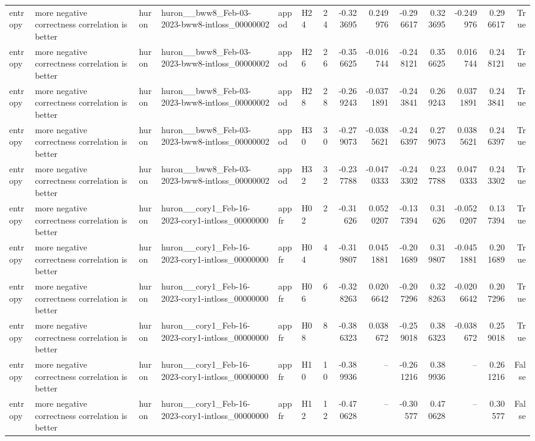 \begin{longtable}{llllllrrrrrrrr}
entropy & more negative correctness correlation is better & huron & huron\_\_bww8\_Feb-03-2023-bww8-intloss\_00000002 & appod & H24 & 24 & -0.323695 & 0.249976 & -0.296617 & 0.323695 & -0.249976 & 0.296617 & True \\
entropy & more negative correctness correlation is better & huron & huron\_\_bww8\_Feb-03-2023-bww8-intloss\_00000002 & appod & H26 & 26 & -0.356625 & -0.016744 & -0.248121 & 0.356625 & 0.016744 & 0.248121 & True \\
entropy & more negative correctness correlation is better & huron & huron\_\_bww8\_Feb-03-2023-bww8-intloss\_00000002 & appod & H28 & 28 & -0.269243 & -0.0371891 & -0.243841 & 0.269243 & 0.0371891 & 0.243841 & True \\
entropy & more negative correctness correlation is better & huron & huron\_\_bww8\_Feb-03-2023-bww8-intloss\_00000002 & appod & H30 & 30 & -0.279073 & -0.0385621 & -0.246397 & 0.279073 & 0.0385621 & 0.246397 & True \\
entropy & more negative correctness correlation is better & huron & huron\_\_bww8\_Feb-03-2023-bww8-intloss\_00000002 & appod & H32 & 32 & -0.237788 & -0.0470333 & -0.243302 & 0.237788 & 0.0470333 & 0.243302 & True \\
entropy & more negative correctness correlation is better & huron & huron\_\_cory1\_Feb-16-2023-cory1-intloss\_00000000 & appfr & H02 & 2 & -0.31626 & 0.0520207 & -0.137394 & 0.31626 & -0.0520207 & 0.137394 & True \\
entropy & more negative correctness correlation is better & huron & huron\_\_cory1\_Feb-16-2023-cory1-intloss\_00000000 & appfr & H04 & 4 & -0.319807 & 0.0451881 & -0.201689 & 0.319807 & -0.0451881 & 0.201689 & True \\
entropy & more negative correctness correlation is better & huron & huron\_\_cory1\_Feb-16-2023-cory1-intloss\_00000000 & appfr & H06 & 6 & -0.328263 & 0.0206642 & -0.207296 & 0.328263 & -0.0206642 & 0.207296 & True \\
entropy & more negative correctness correlation is better & huron & huron\_\_cory1\_Feb-16-2023-cory1-intloss\_00000000 & appfr & H08 & 8 & -0.386323 & 0.038672 & -0.259018 & 0.386323 & -0.038672 & 0.259018 & True \\
entropy & more negative correctness correlation is better & huron & huron\_\_cory1\_Feb-16-2023-cory1-intloss\_00000000 & appfr & H10 & 10 & -0.389936 & -- & -0.261216 & 0.389936 & -- & 0.261216 & False \\
entropy & more negative correctness correlation is better & huron & huron\_\_cory1\_Feb-16-2023-cory1-intloss\_00000000 & appfr & H12 & 12 & -0.470628 & -- & -0.30577 & 0.470628 & -- & 0.30577 & False \\

\end{longtable}
